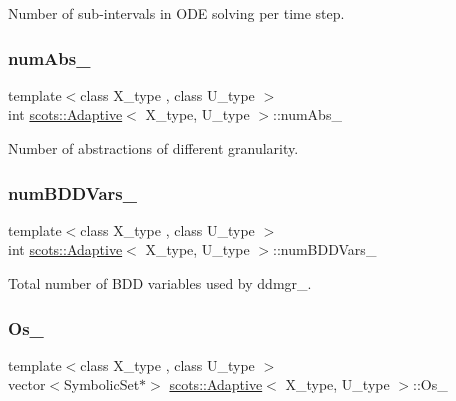 Number of sub-\/intervals in O\+DE solving per time step. \mbox{\label{classscots_1_1Adaptive_afdd5a499494efeb8538346ad9e0f329c}} 
\subsubsection{\texorpdfstring{num\+Abs\+\_\+}{numAbs\_}}
{\footnotesize\ttfamily template$<$class X\+\_\+type , class U\+\_\+type $>$ \\
int \hyperlink{classscots_1_1Adaptive}{scots\+::\+Adaptive}$<$ X\+\_\+type, U\+\_\+type $>$\+::num\+Abs\+\_\+}

Number of abstractions of different granularity. \mbox{\label{classscots_1_1Adaptive_a753d83283386610f1a2283af5cbeba73}} 
\subsubsection{\texorpdfstring{num\+B\+D\+D\+Vars\+\_\+}{numBDDVars\_}}
{\footnotesize\ttfamily template$<$class X\+\_\+type , class U\+\_\+type $>$ \\
int \hyperlink{classscots_1_1Adaptive}{scots\+::\+Adaptive}$<$ X\+\_\+type, U\+\_\+type $>$\+::num\+B\+D\+D\+Vars\+\_\+}

Total number of B\+DD variables used by ddmgr\+\_\+. \mbox{\label{classscots_1_1Adaptive_abed6bfd1256157d4b943078f6486ee36}} 
\subsubsection{\texorpdfstring{Os\+\_\+}{Os\_}}
{\footnotesize\ttfamily template$<$class X\+\_\+type , class U\+\_\+type $>$ \\
vector$<$Symbolic\+Set$\ast$$>$ \hyperlink{classscots_1_1Adaptive}{scots\+::\+Adaptive}$<$ X\+\_\+type, U\+\_\+type $>$\+::Os\+\_\+}

